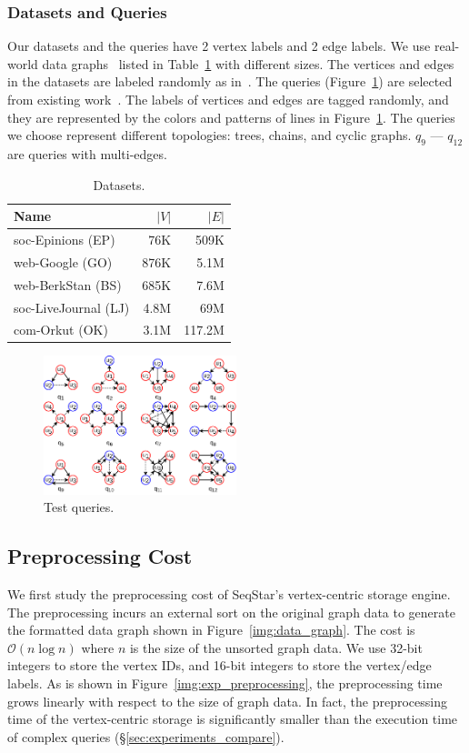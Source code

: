 \subsubsection{Datasets and Queries}
Our datasets and the queries have 2 vertex labels and 2 edge labels.
We use real-world data graphs~\cite{snapnets} listed in Table~\ref{tab:datasets} with different sizes. The vertices and edges in the datasets are labeled randomly as in~\cite{DBLP:journals/pvldb/MhedhbiS19}.
The queries (Figure~\ref{img:queries}) are selected from existing work~\cite{DBLP:conf/cloud/SerafiniMS17,DBLP:journals/pvldb/MhedhbiS19}.
The labels of vertices and edges are tagged randomly,
and they are represented by the colors and patterns of lines in Figure~\ref{img:queries}.
The queries we choose represent different topologies: trees, chains, and cyclic graphs.
$q_9$ --- $q_{12}$ are queries with multi-edges.
\begin{table}
  \caption{Datasets.}\label{tab:datasets}
  \begin{tabular}{lrr}
    \toprule
    Name & $|V|$ & $|E|$ \\
    \midrule
    soc-Epinions (EP) & 76K & 509K \\
    web-Google (GO) & 876K & 5.1M \\
    web-BerkStan (BS) & 685K & 7.6M \\
    soc-LiveJournal (LJ) & 4.8M & 69M \\
    com-Orkut (OK) & 3.1M & 117.2M \\
    \bottomrule
  \end{tabular}
\end{table}

\begin{figure}[ht]
  \centering
  \includegraphics[width=0.5\textwidth]{img/queries.pdf}
  \caption{Test queries.}\label{img:queries}
\end{figure}

\subsection{Preprocessing Cost}
We first study the preprocessing cost of SeqStar's vertex-centric storage engine.
The preprocessing incurs an external sort on the original graph data to generate the formatted data graph shown in Figure~\ref{img:data_graph}.
The cost is $\mathcal{O}(n \log n)$ where $n$ is the size of the unsorted graph data.
We use 32-bit integers to store the vertex IDs, and 16-bit integers to store the vertex/edge labels.
As is shown in Figure~\ref{img:exp_preprocessing}, the preprocessing time grows linearly with respect to the size of graph data.
In fact, the preprocessing time of the vertex-centric storage is significantly smaller than the execution time of complex queries (\S\ref{sec:experiments_compare}).

